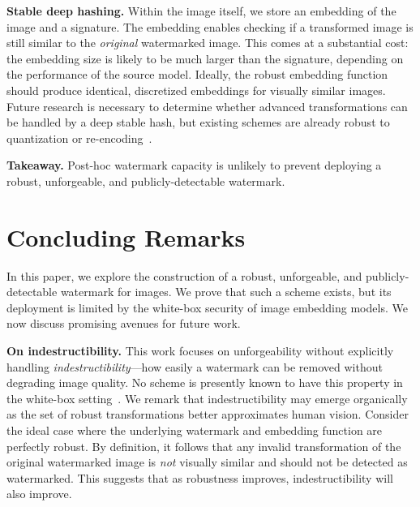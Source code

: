 \documentclass[12pt]{article}
\begin{document}
\textbf{Stable deep hashing.}\label{para:stable_hash}
Within the image itself, we store an embedding of the image and a signature.
The embedding enables checking if a transformed image is still similar to the \textit{original} watermarked image.
This comes at a substantial cost: the embedding size is likely to be much larger than the signature, depending on the performance of the source model.
Ideally, the robust embedding function should produce identical, discretized embeddings for visually similar images.
Future research is necessary to determine whether advanced transformations can be handled by a deep stable hash, but existing schemes are already robust to quantization or re-encoding~\citep{apple2021csam}.

\begin{tcolorbox}[colback=gray!10!white,leftrule=2.5mm,size=title]
\textbf{Takeaway.} Post-hoc watermark capacity is unlikely to prevent deploying a robust, unforgeable, and publicly-detectable watermark.
\end{tcolorbox}

\section{Concluding Remarks}\label{sec:discussion}

In this paper, we explore the construction of a robust, unforgeable, and publicly-detectable watermark for images.
We prove that such a scheme exists, but its deployment is limited by the white-box security of image embedding models.
We now discuss promising avenues for future work.

\textbf{On indestructibility.}
This work focuses on unforgeability without explicitly handling \textit{indestructibility}---how easily a watermark can be removed without degrading image quality.
No scheme is presently known to have this property in the white-box setting~\citep{zhang2023watermarks}.
We remark that indestructibility may emerge organically as the set of robust transformations better approximates human vision.
Consider the ideal case where the underlying watermark and embedding function are perfectly robust.
By definition, it follows that any invalid transformation of the original watermarked image is \textit{not} visually similar and should not be detected as watermarked.
This suggests that as robustness improves, indestructibility will also improve.
\end{document}
